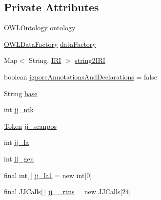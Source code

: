 \subsection*{Private Attributes}
\begin{DoxyCompactItemize}
\item 
\hyperlink{interfaceorg_1_1semanticweb_1_1owlapi_1_1model_1_1_o_w_l_ontology}{O\-W\-L\-Ontology} \hyperlink{classorg_1_1coode_1_1owl_1_1krssparser_1_1_k_r_s_s_parser_afb103accd331ec09fc3999f5faccb476}{ontology}
\item 
\hyperlink{interfaceorg_1_1semanticweb_1_1owlapi_1_1model_1_1_o_w_l_data_factory}{O\-W\-L\-Data\-Factory} \hyperlink{classorg_1_1coode_1_1owl_1_1krssparser_1_1_k_r_s_s_parser_a7fd93f66ce249a5524b8bc07c0d25d13}{data\-Factory}
\item 
Map$<$ String, \hyperlink{classorg_1_1semanticweb_1_1owlapi_1_1model_1_1_i_r_i}{I\-R\-I} $>$ \hyperlink{classorg_1_1coode_1_1owl_1_1krssparser_1_1_k_r_s_s_parser_a255c8d697a241c4d074bf8fde8e69520}{string2\-I\-R\-I}
\item 
boolean \hyperlink{classorg_1_1coode_1_1owl_1_1krssparser_1_1_k_r_s_s_parser_aad3cff6a6a467a85bfdc7f43e1a6e0f3}{ignore\-Annotations\-And\-Declarations} = false
\item 
String \hyperlink{classorg_1_1coode_1_1owl_1_1krssparser_1_1_k_r_s_s_parser_a79b953ce210c836bfc326b55db2f6f21}{base}
\item 
int \hyperlink{classorg_1_1coode_1_1owl_1_1krssparser_1_1_k_r_s_s_parser_aff67b1ba74333e07890cc0132f20aae7}{jj\-\_\-ntk}
\item 
\hyperlink{classorg_1_1coode_1_1owl_1_1krssparser_1_1_token}{Token} \hyperlink{classorg_1_1coode_1_1owl_1_1krssparser_1_1_k_r_s_s_parser_a8abdd65f635566bc40d97479ed73b8f9}{jj\-\_\-scanpos}
\item 
int \hyperlink{classorg_1_1coode_1_1owl_1_1krssparser_1_1_k_r_s_s_parser_ae884b4b188e1fb34379247a95d046da1}{jj\-\_\-la}
\item 
int \hyperlink{classorg_1_1coode_1_1owl_1_1krssparser_1_1_k_r_s_s_parser_afa4550c360b395d7e6e017187ebe64f8}{jj\-\_\-gen}
\item 
final int\mbox{[}$\,$\mbox{]} \hyperlink{classorg_1_1coode_1_1owl_1_1krssparser_1_1_k_r_s_s_parser_aa1595e406c413313018512a58bb64775}{jj\-\_\-la1} = new int\mbox{[}0\mbox{]}
\item 
final J\-J\-Calls\mbox{[}$\,$\mbox{]} \hyperlink{classorg_1_1coode_1_1owl_1_1krssparser_1_1_k_r_s_s_parser_a08eb2be15b236a5d7e5a9f0126e91f60}{jj\-\_\-\_\-rtns} = new J\-J\-Calls\mbox{[}24\mbox{]}

\end{DoxyCompactItemize}
